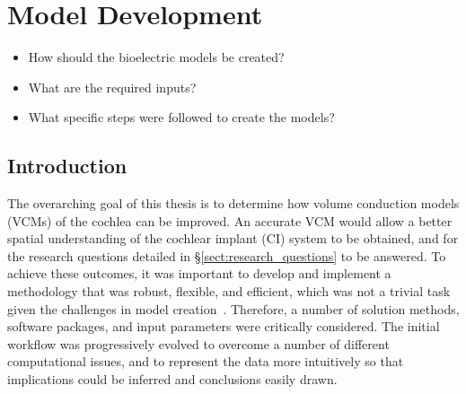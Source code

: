 \setstretchnormal

\chapter{Model Development}
\label{sect:modelling}

\begin{center}
	\begin{tcolorbox}[title=\boxtitle]
		\begin{itemize}[leftmargin=*,labelindent=2ex,labelsep=1.5ex,itemsep=0pt,parsep=0pt]
			\item How should the bioelectric models be created?
			\item What are the required inputs?
			\item What specific steps were followed to create the models?
		\end{itemize}
	\end{tcolorbox}
\end{center}



\section{Introduction}

The overarching goal of this thesis is to determine how volume conduction models
(VCMs) of the cochlea can be improved. An accurate VCM would allow a better
spatial understanding of the cochlear implant (CI) system to be obtained, and
for the research questions detailed in \S\ref{sect:research_questions} to be
answered. To achieve these outcomes, it was important to develop and implement a
methodology that was robust, flexible, and efficient, which was not a trivial
task given the challenges in model
creation~\cite{briaire2000mesh,whiten2007,potratz2010,saba2012}. Therefore, a
number of solution methods, software packages, and input parameters were
critically considered. The initial workflow was progressively evolved to
overcome a number of different computational issues, and to represent the data
more intuitively so that implications could be inferred and conclusions easily
drawn.

